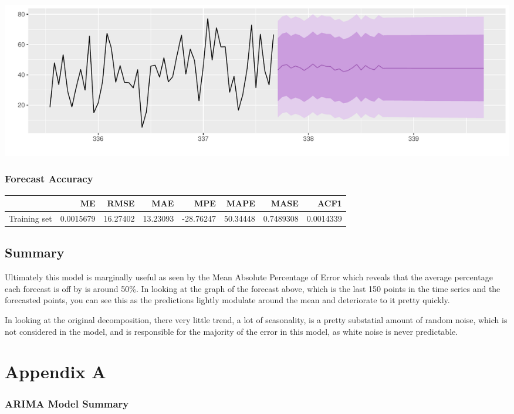 \documentclass[openany]{book}
\begin{document}
\includegraphics{Group2_Project1_Fall2019_files/figure-latex/unnamed-chunk-29-1.pdf}

\hypertarget{forecast-accuracy}{%
\subsection{Forecast Accuracy}\label{forecast-accuracy}}

\begin{tabular}{l|r|r|r|r|r|r|r}
\hline
  & ME & RMSE & MAE & MPE & MAPE & MASE & ACF1\\
\hline
Training set & 0.0015679 & 16.27402 & 13.23093 & -28.76247 & 50.34448 & 0.7489308 & 0.0014339\\
\hline
\end{tabular}

\hypertarget{summary-2}{%
\section{Summary}\label{summary-2}}

Ultimately this model is marginally useful as seen by the Mean Absolute
Percentage of Error which reveals that the average percentage each
forecast is off by is around 50\%. In looking at the graph of the
forecast above, which is the last 150 points in the time series and the
forecasted points, you can see this as the predictions lightly modulate
around the mean and deteriorate to it pretty quickly.

In looking at the original decomposition, there very little trend, a lot
of seasonality, is a pretty substatial amount of random noise, which is
not considered in the model, and is responsible for the majority of the
error in this model, as white noise is never predictable.

\hypertarget{appendix-a}{%
\chapter*{Appendix A}\label{appendix-a}}

\hypertarget{arima-a}{%
\subsection*{ARIMA Model Summary}\label{arima-a}}
\end{document}
